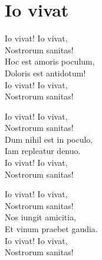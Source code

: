 \section{Io vivat}
Io vivat! Io vivat,\\
Nostrorum sanitas!\\
Hoc est amoris poculum,\\
Doloris est antidotum!\\
Io vivat! Io vivat,\\
Nostrorum sanitas!

Io vivat! Io vivat,\\
Nostrorum sanitas!\\
Dum nihil est in poculo,\\
Iam repleatur denuo.\\
Io vivat! Io vivat,\\
Nostrorum sanitas!

Io vivat! Io vivat,\\
Nostrorum sanitas!\\
Nos iungit amicitia,\\
Et vinum praebet gaudia.\\
Io vivat! Io vivat,\\
Nostrorum sanitas!
